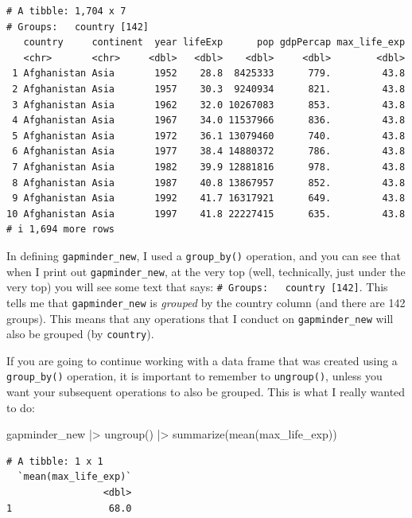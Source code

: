 \documentclass[
  letterpaper,
  DIV=11,
  numbers=noendperiod]{scrreprt}
\newenvironment{Shaded}{\begin{snugshade}}{\end{snugshade}}
\newcommand{\FunctionTok}[1]{\textcolor[rgb]{0.28,0.35,0.67}{#1}}
\newcommand{\NormalTok}[1]{\textcolor[rgb]{0.00,0.23,0.31}{#1}}
\newcommand{\SpecialCharTok}[1]{\textcolor[rgb]{0.37,0.37,0.37}{#1}}
\begin{document}
\begin{verbatim}
# A tibble: 1,704 x 7
# Groups:   country [142]
   country     continent  year lifeExp      pop gdpPercap max_life_exp
   <chr>       <chr>     <dbl>   <dbl>    <dbl>     <dbl>        <dbl>
 1 Afghanistan Asia       1952    28.8  8425333      779.         43.8
 2 Afghanistan Asia       1957    30.3  9240934      821.         43.8
 3 Afghanistan Asia       1962    32.0 10267083      853.         43.8
 4 Afghanistan Asia       1967    34.0 11537966      836.         43.8
 5 Afghanistan Asia       1972    36.1 13079460      740.         43.8
 6 Afghanistan Asia       1977    38.4 14880372      786.         43.8
 7 Afghanistan Asia       1982    39.9 12881816      978.         43.8
 8 Afghanistan Asia       1987    40.8 13867957      852.         43.8
 9 Afghanistan Asia       1992    41.7 16317921      649.         43.8
10 Afghanistan Asia       1997    41.8 22227415      635.         43.8
# i 1,694 more rows
\end{verbatim}

In defining \texttt{gapminder\_new}, I used a \texttt{group\_by()}
operation, and you can see that when I print out
\texttt{gapminder\_new}, at the very top (well, technically, just under
the very top) you will see some text that says:
\texttt{\#\ Groups:\ \ \ country\ {[}142{]}}. This tells me that
\texttt{gapminder\_new} is \emph{grouped} by the country column (and
there are 142 groups). This means that any operations that I conduct on
\texttt{gapminder\_new} will also be grouped (by \texttt{country}).

If you are going to continue working with a data frame that was created
using a \texttt{group\_by()} operation, it is important to remember to
\texttt{ungroup()}, unless you want your subsequent operations to also
be grouped. This is what I really wanted to do:

\begin{Shaded}
\begin{Highlighting}[]
\NormalTok{gapminder\_new }\SpecialCharTok{|\textgreater{}} \FunctionTok{ungroup}\NormalTok{() }\SpecialCharTok{|\textgreater{}} \FunctionTok{summarize}\NormalTok{(}\FunctionTok{mean}\NormalTok{(max\_life\_exp))}
\end{Highlighting}
\end{Shaded}

\begin{verbatim}
# A tibble: 1 x 1
  `mean(max_life_exp)`
                 <dbl>
1                 68.0
\end{verbatim}
\end{document}
